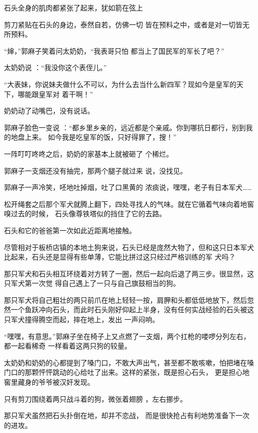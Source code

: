 \documentclass{article}
\begin{document}
石头全身的肌肉都紧张了起来，犹如箭在弦上

剪刀紧贴在石头的身边，泰然自若，仿佛一切
皆在预料之中，或者是对一切皆无所预料。 

“婶，”郭麻子笑着问太奶奶，“我表哥只怕
都当上了国民军的军长了吧？” 

\newpage


太奶奶说 ：“我没你这个表侄儿。” 

“大表妹，你说妹夫做什么不可以，为什么去当什么新四军？现如今是皇军的天下，哪能跟皇军对
着干啊！” 


奶奶动了动嘴巴，没有说话。 

郭麻子脸色一变说 ：“都乡里乡亲的，远近都是个亲戚。你到哪抗日都行，别到我的地盘上来。
如今我是吃皇军的饭，只好得罪了，搜！” 

一阵叮叮咚咚之后，奶奶的家基本上就被砸了
个稀烂。 

郭麻子一支烟还没有抽完，那两个腿子就过来
说，没找见。 

郭麻子一声冷笑，呸地吐掉烟，吐了口黑黄的
浓痰说，嘿嘿，老子有日本军犬…… 

\newpage

松开绳套之后那个军犬就腾上翻下，四处寻找人的气味。就在它循着气味向着地窖嗅过去的时候，
石头像尊铁塔似的挡住了它的去路。 


石头和它的爸爸第一次如此近距离地接触。 

尽管相对于板桥店镇的本地土狗来说，石头已经是庞然大物了，但和这只日本军犬比起来，石头还是显得有些单薄，它能比拼过这只经过严格训练的军
犬吗？ 

那只军犬和石头相互环绕着对方转了一圈，然后一起向后退了两三步。很显然，这只军犬第一次觉
得自己遇上了一只与自己旗鼓相当的狗。 

那只军犬将自己粗壮的两只前爪在地上轻轻一按，肩胛和头都低低地放下，然后忽然一个鱼跃冲向石头，而此时石头刚好仰起上半身，没有任何实战经验的石头被这只军犬撞得腾空而起，摔在地上，发出
一声闷响。 

\newpage

“嘿嘿，有意思。”郭麻子坐在椅子上又点燃了一支烟，两个扛枪的喽啰分列左右，都一起看稀奇
一样看着这两只狗的较量。 

太奶奶和奶奶的心都提到了嗓门口，不敢大声出气，甚至都不敢咳嗽，怕把堵在嗓门口的那颗怦怦跳动的心给吐了出来。这样的紧张，既是担心石头，
更是担心地窖里藏身的爷爷被汉奸发现。 

只有剪刀围绕着两只战斗着的狗，微张着翅膀
，左右挪步。 

那只军犬虽然把石头扑倒在地，却并不恋战，
而是很快抢占有利地势准备下一次的进攻。 
\end{document}
